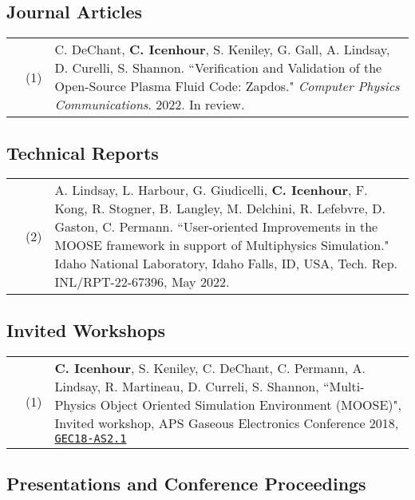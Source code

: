 \documentclass{article}
\begin{document}
\subsection*{Journal Articles}

  \begin{tabularx}{\textwidth}{l l X}
    \hspace{2em}
      & (1) &  C. DeChant, \textbf{C. Icenhour}, S. Keniley, G. Gall, A. Lindsay, D. Curelli, S. Shannon. ``Verification and Validation of the Open-Source Plasma Fluid Code: Zapdos." \textit{Computer Physics Communications}. 2022. In review.\\
  \end{tabularx}

\subsection*{Technical Reports}

  \begin{tabularx}{\textwidth}{l l X}
    \hspace{2em}
      & (2) & A. Lindsay, L. Harbour, G. Giudicelli, \textbf{C. Icenhour}, F. Kong, R. Stogner, B. Langley, M. Delchini, R. Lefebvre, D. Gaston, C. Permann. ``User-oriented Improvements in the MOOSE framework in support of Multiphysics Simulation." Idaho National Laboratory, Idaho Falls, ID, USA, Tech. Rep. INL/RPT-22-67396, May 2022. \\
  \end{tabularx}

\subsection*{Invited Workshops}

	\begin{tabularx}{\textwidth}{l l X}
		\hspace{2em}
			& (1)  & \textbf{C. Icenhour}, S. Keniley, C. DeChant, C. Permann, A. Lindsay, R. Martineau, D. Curreli, S. Shannon, ``Multi-Physics Object Oriented Simulation Environment (MOOSE)", Invited workshop, APS Gaseous Electronics Conference 2018, \href{http://meetings.aps.org/link/BAPS.2018.GEC.AS2.1}{\texttt{GEC18-AS2.1}}
	\end{tabularx}

\subsection*{Presentations and Conference Proceedings}
\end{document}
